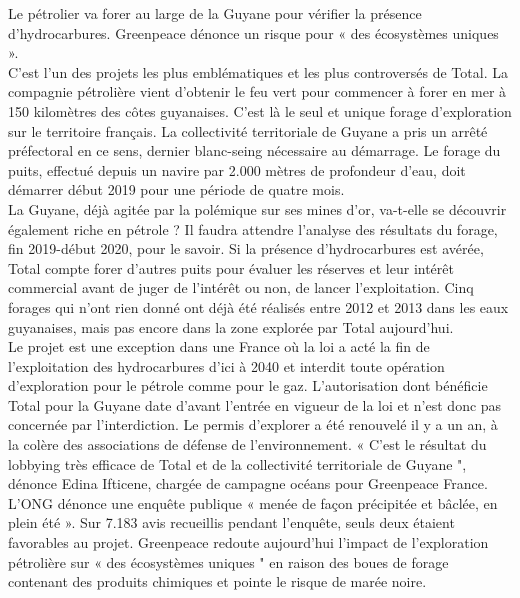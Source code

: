 \documentclass[8pt]{article}
\begin{document}
Le pétrolier va forer au large de la Guyane pour vérifier la présence d'hydrocarbures. Greenpeace dénonce un risque pour « des écosystèmes uniques ».\\

C'est l'un des projets les plus emblématiques et les plus controversés de Total. La compagnie pétrolière vient d'obtenir le feu vert pour commencer à forer en mer à 150 kilomètres des côtes guyanaises. C'est là le seul et unique forage d'exploration sur le territoire français. La collectivité territoriale de Guyane a pris un arrêté préfectoral en ce sens, dernier blanc-seing nécessaire au démarrage. Le forage du puits, effectué depuis un navire par 2.000 mètres de profondeur d'eau, doit démarrer début 2019 pour une période de quatre mois.\\

La Guyane, déjà agitée par la polémique sur ses mines d'or, va-t-elle se découvrir également riche en pétrole ? Il faudra attendre l'analyse des résultats du forage, fin 2019-début 2020, pour le savoir. Si la présence d'hydrocarbures est avérée, Total compte forer d'autres puits pour évaluer les réserves et leur intérêt commercial avant de juger de l'intérêt ou non, de lancer l'exploitation. Cinq forages qui n'ont rien donné ont déjà été réalisés entre 2012 et 2013 dans les eaux guyanaises, mais pas encore dans la zone explorée par Total aujourd'hui.\\

Le projet est une exception dans une France où la loi a acté la fin de l'exploitation des hydrocarbures d'ici à 2040 et interdit toute opération d'exploration pour le pétrole comme pour le gaz. L'autorisation dont bénéficie Total pour la Guyane date d'avant l'entrée en vigueur de la loi et n'est donc pas concernée par l'interdiction. Le permis d'explorer a été renouvelé il y a un an, à la colère des associations de défense de l'environnement. « C'est le résultat du lobbying très efficace de Total et de la collectivité territoriale de Guyane ", dénonce Edina Ifticene, chargée de campagne océans pour Greenpeace France.\\

L'ONG dénonce une enquête publique « menée de façon précipitée et bâclée, en plein été ». Sur 7.183 avis recueillis pendant l'enquête, seuls deux étaient favorables au projet. Greenpeace redoute aujourd'hui l'impact de l'exploration pétrolière sur « des écosystèmes uniques " en raison des boues de forage contenant des produits chimiques et pointe le risque de marée noire.\\
\end{document}
